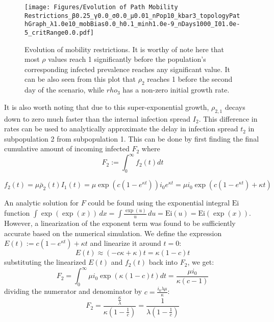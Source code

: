\begin{figure}[!ht]
    \centering
    \texttt{[image: Figures/Evolution of Path Mobility Restrictions\_β0.25\_γ0.0\_σ0.0\_μ0.01\_nPop10\_kbar3\_topologyPathGraph\_λ1.0e10\_mobBias0.0\_h0.1\_minh1.0e-9\_nDays1000\_I01.0e-5\_critRange0.0.pdf]}
    \caption{\small Evolution of mobility restrictions. It is worthy of note here that most $\rho$ values reach 1 significantly before the population's corresponding infected prevalence reaches any significant value. It can be also seen from this plot that $\rho_2$ reaches 1 before the second day of the scenario, while $rho_3$ has a non-zero initial growth rate.}
\end{figure}

It is also worth noting that due to this super-exponential growth, $\rho_{2,1}$ decays down to zero much faster than the internal infection spread $I_2$. This difference in rates can be used to analytically approximate the delay in infection spread $t_2$ in subpopulation 2 from subpopulation 1. This can be done by first finding the final cumulative amount of incoming infected $F_2$ where 
\begin{equation}F_2:=\int_0^\infty f_2(t)dt\end{equation}
 

\begin{equation}f_2(t)=\mu \bar \rho_2(t) I_1(t) = \mu \exp\left({c \left( 1 - e^{\kappa t} \right)}\right)i_0 e^{\kappa t} = \mu i_0 \exp\left({c \left( 1 - e^{\kappa t} \right)} +\kappa t\right)\end{equation}

An analytic solution for $F$ could be found using the exponential integral $\mathrm{Ei}$ function  $\int\exp(\exp(x))\,d x=\int{\frac{\exp(u)}{u}}\,d u={\mathrm{Ei}}(u)={\mathrm{Ei}}(\exp(x))$. However, a linearization of the exponent term was found to be sufficiently accurate based on the numerical simulation. We define the expression $E(t):=c\left( 1 - e^{\kappa t} \right)+\kappa t$ and linearize it around $t=0$: 
\begin{equation}E(t)\approx (-c\kappa+\kappa)t = \kappa (1-c) t\end{equation}
substituting the linearized $E(t)$ and $f_2(t)$ back into $F_2$, we get:
\begin{equation}F_2=\int_0^\infty \mu i_0 \exp\left(\kappa (1-c) t \right) dt = \frac{\mu i_0}{\kappa(c-1)}\end{equation}
dividing the numerator and denominator by $c=\frac{i_{0} \lambda \mu}{\kappa}$:
\begin{equation}
F_2=\frac{\frac{\kappa}{\lambda}}{\kappa\left( 1-\frac{1}{c} \right)}=\frac{1}{\lambda\left( 1-\frac{1}{c} \right)}
\end{equation}

